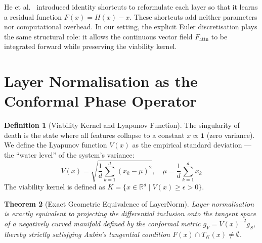 \documentclass[11pt,a4paper]{article}
\newtheorem{theorem}{Theorem}[section]
\theoremstyle{definition}
\newtheorem{definition}[theorem]{Definition}
\theoremstyle{remark}
\begin{document}
He et al.~\cite{he2016} introduced identity shortcuts to reformulate each layer so that it learns a residual function $F(x) = H(x) - x$. These shortcuts add neither parameters nor computational overhead. In our setting, the explicit Euler discretisation plays the same structural role: it allows the continuous vector field $F_{\mathrm{attn}}$ to be integrated forward while preserving the viability kernel.


\section{Layer Normalisation as the Conformal Phase Operator}

\begin{definition}[Viability Kernel and Lyapunov Function]\label{def:viab_kernel}
The singularity of death is the state where all features collapse to a constant $x \propto \mathbf{1}$ (zero variance). We define the Lyapunov function $V(x)$ as the empirical standard deviation --- the ``water level'' of the system's variance:
\[
  V(x) = \sqrt{\frac{1}{d}\sum_{k=1}^d (x_k - \mu)^2}, \quad \mu = \frac{1}{d}\sum_{k=1}^d x_k
\]
The viability kernel is defined as $K = \{x \in \mathbb{R}^d \mid V(x) \geq \epsilon > 0\}$.
\end{definition}

\begin{theorem}[Exact Geometric Equivalence of LayerNorm]\label{thm:layernorm}
Layer normalisation is exactly equivalent to projecting the differential inclusion onto the tangent space of a negatively curved manifold defined by the conformal metric $g_V = V(x)^{-2} g_S$, thereby strictly satisfying Aubin's tangential condition $F(x) \cap T_K(x) \neq \emptyset$.
\end{theorem}
\end{document}
